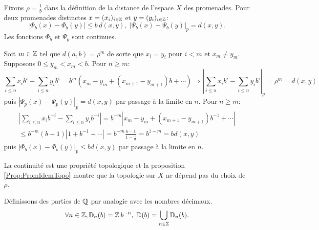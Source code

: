 \begin{prop}
Fixons $\rho = \frac{1}{b}$ dans la définition de la distance de l'espace $X$ des promenades. Pour deux promenades distinctes $x=(x_i)_{i\in \mathbb{Z}}$ et $y=(y_i)_{i\in \mathbb{Z}}$:
\begin{displaymath}
 \left| \Phi_b(x) - \Phi_b(y)\right| \leq b\, d(x,y), \; \left| \Psi_b(x) - \Psi_b(y)\right|_p = d(x,y).
\end{displaymath}
Les fonctions $\Phi_b$ et $\Psi_p$ sont continues.
\end{prop}
\begin{demo}
Soit $m\in \mathbb{Z}$ tel que $d(a,b) = \rho^m$ de sorte que $x_i = y_i$ pour $i<m$ et $x_m \neq y_m$. Supposons $0 \leq y_m < x_m < b$. Pour $n\geq m$:
\begin{displaymath}
 \sum_{i\leq n}x_ib^i - \sum_{i\leq n}y_ib^i = b^m \left( x_m - y_m + (x_{m+1}-y_{m+1})b +\cdots \right)
 \Rightarrow \left| \sum_{i\leq n}x_ib^i - \sum_{i\leq n}y_ib^i\right|_p = \rho^m = d(x,y)
\end{displaymath}
puis $\left| \Psi_p(x) - \Psi_p(y)\right|_p = d(x,y)$ par passage à la limite en $n$.\newline
Pour $n\geq m$:
\begin{multline*}
 \left|\sum_{i\leq n}x_ib^{-i} - \sum_{i\leq n}y_ib^{-i}\right| = b^{-m} \left| x_m - y_m + (x_{m+1}-y_{m+1})b^{-1} +\cdots \right| \\
   \leq b^{-m} (b-1)\left| 1 + b^{-1} +\cdots \right|
   = b^{-m} \frac{b-1}{1-\frac{1}{b}} = b^{1-m} = b d(x,y)
\end{multline*}
puis $\left| \Phi_b(x) - \Phi_b(y)\right|_p \leq b d(x,y)$ par passage à la limite en $n$.
\end{demo}
\begin{rem}
 La continuité est une propriété topologique et la proposition \ref{Prop:PromIdemTopo} montre que la topologie sur $X$ ne dépend pas du choix de $\rho$.
\end{rem}

\begin{defi}
  Définissons des parties de $\mathbb{Q}$ par analogie avec les nombres décimaux.
  \begin{displaymath}
   \forall n \in \mathbb{Z}, \mathbb{D}_n(b) = \mathbb{Z}\, b^{-n}, \; \mathbb{D}(b) = \bigcup_{n\in \mathbb{Z}} \mathbb{D}_n(b).
  \end{displaymath}
\end{defi}

